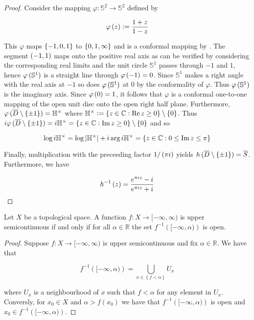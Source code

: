 \begin{proof}
	Consider the mapping $\varphi: \mathbb{S}^2 \to \mathbb{S}^2$ defined by

	\begin{equation*}
		\varphi\del{z} := \frac{1 + z}{1 - z}
	\end{equation*}

	This $\varphi$ maps $\cbr{-1,0,1}$ to $\cbr{0,1,\infty}$ and is a conformal mapping by \cite[278--279]{rudin:rc_analysis:1987}. The segment $\intoo{-1,1}$ maps onto the positive real axis as can be verified by considering the corresponding real limits and the unit circle $\mathbb{S}^1$ passes through $-1$ and $1$, hence $\varphi\del[0]{\mathbb{S}^1}$ is a straight line through $\varphi\del{-1} = 0$. Since $\mathbb{S}^1$ makes a right angle with the real axis at $-1$ so does $\varphi\del[0]{\mathbb{S}^1}$ at $0$ by the conformality of $\varphi$. Thus $\varphi\del[0]{\mathbb{S}^1}$ is the imaginary axis. Since $\varphi\del{0} = 1$, it follows that $\varphi$ is a conformal one-to-one mapping of the open unit disc onto the open right half plane. Furthermore, $\varphi\del[0]{\overline{D}\setminus \cbr{\pm 1}} = \mathbb{H}^\times$ where $\mathbb{H}^\times := \cbr{z \in \mathbb{C} : \Re z \geq 0} \setminus \cbr{0}$. Thus $i\varphi\del[0]{\overline{D}\setminus \cbr{\pm 1}} = i\mathbb{H}^\times = \cbr{z \in \mathbb{C} : \Im z \geq 0} \setminus \cbr{0}$ and so 
	
	\begin{equation*}
		\log i\mathbb{H}^\times = \log \abs[0]{\mathbb{H}^\times} + i \arg i\mathbb{H}^\times = \cbr{z \in \mathbb{C} : 0 \leq \Im z \leq \pi}
	\end{equation*}

	Finally, multiplication with the preceeding factor $1/\del{\pi i}$ yields $h\del[0]{\overline{D} \setminus \cbr{\pm 1}} = \overline{S}$. Furthermore, we have

	\begin{equation*}
		h^{-1}\del{z} = \frac{e^{\pi iz} - i}{e^{\pi i z} + i}
	\end{equation*}
\end{proof}

\begin{lemma*}
	Let $X$ be a topological space. A function $f: X \to [-\infty,\infty)$ is upper semicontinuous if and only if for all $\alpha \in \mathbb{R}$ the set $f^{-1}\left( [-\infty,\alpha )\right)$ is open. 
\end{lemma*}

\begin{proof}
	Suppose $f: X \to [-\infty,\infty)$ is upper semicontinuous and fix $\alpha \in \mathbb{R}$. We have that 

		\begin{equation*}
			f^{-1}\left( [-\infty,\alpha )\right) = \bigcup_{x \in \left\{ f < \alpha \right\}} U_x
		\end{equation*}

		\noindent where $U_x$ is a neighbourhood of $x$ such that $f < \alpha$ for any element in $U_x$. Conversly, for $x_0 \in X$ and $\alpha > f(x_0)$ we have that $f^{-1}\left( [-\infty,\alpha )\right)$ is open and $x_0 \in f^{-1}\left( [-\infty,\alpha )\right)$.
\end{proof}

